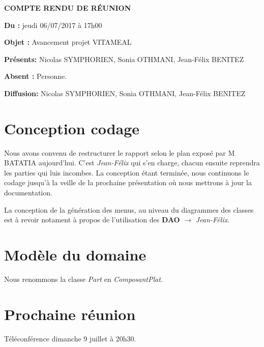 \documentclass[11pt,a4paper,french,twoside,openright]{article}
\begin{document}
\pagestyle{fancy}

\begin{center}\bfseries\Huge
COMPTE RENDU DE RÉUNION
\end{center}

\textbf{Du      :} jeudi 06/07/2017 à 17h00

\textbf{Objet   :} Avancement projet VITAMEAL

\textbf{Présents:} Nicolas SYMPHORIEN, Sonia OTHMANI, Jean-Félix BENITEZ

\textbf{Absent :} Personne.

\textbf{Diffusion:} Nicolas SYMPHORIEN, Sonia OTHMANI, Jean-Félix BENITEZ

\hrulefill

\section{Conception codage}
Nous avons convenu de restructurer le rapport selon le plan exposé par M BATATIA aujourd'hui. C'est \emph{Jean-Félix} qui s'en charge, chacun ensuite reprendra les parties qui luis incombes. La conception étant terminée, nous continuons le codage jusqu'à la veille de la prochaine présentation où nous mettrons à jour la documentation.

La conception de la génération des menus, au niveau du diagrammes des classes est à revoir notament à propos de l'utilisation des \textbf{DAO} $\rightarrow$ \emph{Jean-Félix}.

\section{Modèle du domaine}
Nous renommons la classe \emph{Part} en \emph{ComposantPlat}.

\section{Prochaine réunion}
Téléconférence dimanche 9 juillet à 20h30.
\end{document}

